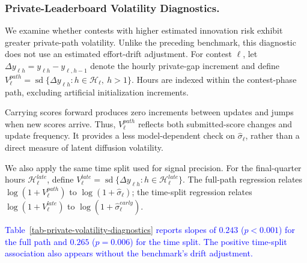 \documentclass[mnsc]{informs3}
\begin{document}
\subsubsection{Private-Leaderboard Volatility Diagnostics.}
{We examine whether contests with higher estimated innovation risk exhibit greater private-path volatility. Unlike the preceding benchmark, this diagnostic does not use an estimated effort-drift adjustment. For contest $\ell$, let $\Delta y_{\ell h}=y_{\ell h}-y_{\ell,h-1}$ denote the hourly private-gap increment and define $V_\ell^{path}=\operatorname{sd}\{\Delta y_{\ell h}:h\in\mathcal H_\ell,\ h>1\}$. Hours are indexed within the contest-phase path, excluding artificial initialization increments.}

{Carrying scores forward produces zero increments between updates and jumps when new scores arrive. Thus, $V_\ell^{path}$ reflects both submitted-score changes and update frequency. It provides a less model-dependent check on $\hat\sigma_\ell$, rather than a direct measure of latent diffusion volatility.}

{We also apply the same time split used for signal precision. For the final-quarter hours $\mathcal H_\ell^{late}$, define $V_\ell^{late}=\operatorname{sd}\{\Delta y_{\ell h}:h\in\mathcal H_\ell^{late}\}$. The full-path regression relates $\log(1+V_\ell^{path})$ to $\log(1+\hat\sigma_\ell)$; the time-split regression relates $\log(1+V_\ell^{late})$ to $\log(1+\hat\sigma_\ell^{early})$.}

\textcolor{blue}{Table~\ref{tab-private-volatility-diagnostics} reports slopes of $0.243$ ($p<0.001$) for the full path and $0.265$ ($p=0.006$) for the time split. The positive time-split association also appears without the benchmark's drift adjustment.}
\end{document}
